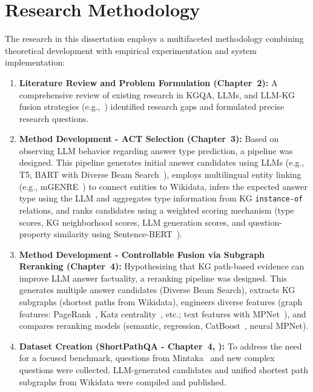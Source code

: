 \section*{Research Methodology}
\label{sec:synopsis:methodology}
The research in this dissertation employs a multifaceted methodology combining theoretical development with empirical experimentation and system implementation:
\begin{enumerate}
    \item \textbf{Literature Review and Problem Formulation (Chapter~2):} A comprehensive review of existing research in KGQA, LLMs, and LLM-KG fusion strategies (e.g.,~\cite{DBLP:journals/tkde/PanLWCWW24, DBLP:conf/ijcai/0001LW0S0Y24}) identified research gaps and formulated precise research questions.
    \item \textbf{Method Development - ACT Selection (Chapter~3):} Based on observing LLM behavior regarding answer type prediction, a pipeline was designed. This pipeline generates initial answer candidates using LLMs (e.g., T5, BART with Diverse Beam Search~\cite{DBLP:journals/corr/VijayakumarCSSL16-diverse-beam-search}), employs multilingual entity linking (e.g., mGENRE~\cite{decao2021multilingual}) to connect entities to Wikidata, infers the expected answer type using the LLM and aggregates type information from KG \texttt{instance-of} relations, and ranks candidates using a weighted scoring mechanism (type scores, KG neighborhood scores, LLM generation scores, and question-property similarity using Sentence-BERT~\cite{reimers-2019-sentence-bert}).
    \item \textbf{Method Development - Controllable Fusion via Subgraph Reranking (Chapter~4):} Hypothesizing that KG path-based evidence can improve LLM answer factuality, a reranking pipeline was designed. This generates multiple answer candidates (Diverse Beam Search), extracts KG subgraphs (shortest paths from Wikidata), engineers diverse features (graph features: PageRank~\cite{page1999pagerank}, Katz centrality~\cite{katz1953new}, etc.; text features with MPNet~\cite{DBLP:conf/nips/Song0QLL20}), and compares reranking models (semantic, regression, CatBoost~\cite{DBLP:conf/nips/ProkhorenkovaGV18-catboost}, neural MPNet).
    \item \textbf{Dataset Creation (ShortPathQA - Chapter~4, \cite{DBLP:conf/nldb/SalnikovSPQA25}):} To address the need for a focused benchmark, questions from Mintaka~\cite{DBLP:conf/coling/SenAS22-mintaka} and new complex questions were collected. LLM-generated candidates and unified shortest path subgraphs from Wikidata were compiled and published.

\end{enumerate}
